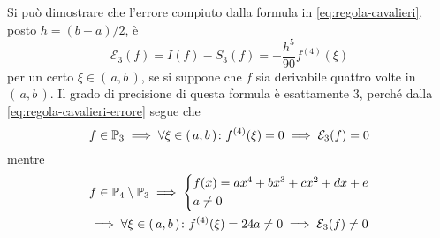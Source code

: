 	Si può dimostrare che l'errore compiuto dalla formula in \eqref{eq:regola-cavalieri}, posto \(h = (b - a) / 2\), è
	\begin{equation}\label{eq:regola-cavalieri-errore}
		\mathcal{E}_3 (f) = I (f) - S_3 (f) = - \frac{h^5}{90} f^{(4)} (\xi)
	\end{equation}
	per un certo \(\xi \in (\, a, b \,)\), se si suppone che \(f\) sia derivabile quattro volte in \((\, a, b \,)\). Il grado di precisione di questa formula è esattamente \(3\), perché dalla \eqref{eq:regola-cavalieri-errore} segue che
	\begin{equation*}
		f \in \P_3 \implies \forall \xi \in (\, a, b \,) \colon f^{(4)} (\xi) = 0 \implies \mathcal{E}_3 (f) = 0
	\end{equation*}
	mentre
	\begin{multline*}
		f \in \P_4 \setminus \P_3 \implies
		\begin{cases*}
			f (x) = a x^4 + b x^3 + c x^2 + d x + e \\
			a \ne 0
		\end{cases*} \\
		\implies \forall \xi \in (\, a, b \,) \colon f^{(4)} (\xi) = 24 a \ne 0 \implies \mathcal{E}_3 (f) \ne 0
	\end{multline*}


